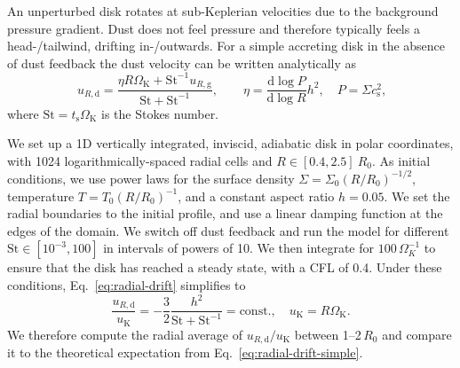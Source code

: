 \documentclass[fleqn,usenatbib,useAMS]{mnras}
\newcommand{\D}[2]{\frac{\text{d}{#1}}{\text{d}{#2}}}
\newcommand{\cs}{c_\mathrm{s}}
\newcommand{\OmegaK}{\Omega_\mathrm{K}}
\newcommand{\vK}{u_\mathrm{K}}
\newcommand{\St}{\mathrm{St}}
\newcommand{\ts}{t_\mathrm{s}}
\begin{document}
An unperturbed disk rotates at sub-Keplerian velocities due to the background pressure gradient. Dust does not feel pressure and therefore typically feels a head-/tailwind, drifting in-/outwards. For a simple accreting disk in the absence of dust feedback the dust velocity can be written analytically \citep{takeuchi-lin-2002} as
%
\begin{equation}\
	\label{eq:radial-drift}
    u_{R,\text{d}} = \frac{\eta R\OmegaK + \St^{-1} u_{R,\text{g}}}{\St + \St^{-1}}, \qquad \eta = \D{\log P}{\log R} h^2, \quad P = \Sigma \cs^2,
\end{equation}
%
where $\St = \ts \OmegaK$ is the Stokes number.

We set up a 1D vertically integrated, inviscid, adiabatic disk in polar coordinates, with 1024 logarithmically-spaced radial cells and $R\in[0.4, 2.5]~R_0$. As initial conditions, we use power laws for the surface density $\Sigma = \Sigma_0(R/R_0)^{-1/2}$, temperature $T = T_0(R/R_0)^{-1}$, and a constant aspect ratio $h = 0.05$. 
We set the radial boundaries to the initial profile, and use a linear damping function at the edges of the domain. We switch off dust feedback and run the model for different $\St \in [10^{-3}, 100]$ in intervals of powers of 10. We then integrate for $100\,\Omega_K^{-1}$ to ensure that the disk has reached a steady state, with a CFL of 0.4. Under these conditions, Eq.~\eqref{eq:radial-drift} simplifies to
%
\begin{equation}
	\label{eq:radial-drift-simple}
	\frac{u_{R,\text{d}}}{\vK} = -\frac{3}{2}\frac{h^2}{\St + \St^{-1}} = \text{const.}, \quad \vK = R\OmegaK.
\end{equation}
%
We therefore compute the radial average of $u_{R,\text{d}}/\vK$ between 1--2\,$R_0$ and compare it to the theoretical expectation from Eq.~\eqref{eq:radial-drift-simple}.
\end{document}
